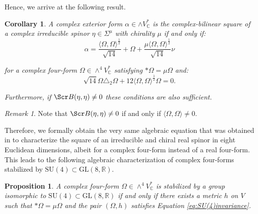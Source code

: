 \documentclass[10pt,a4paper,twoside,reqno]{amsart}
\theoremstyle{plain}
\newtheorem{prop}[thm]{Proposition}
\newtheorem{cor}[thm]{Corollary}
\theoremstyle{definition}
\theoremstyle{remark}
\newtheorem{remark}[thm]{Remark}
\def\C{\mathbb{C}}
\def\scB{\Scr B}
\def\SU{\mathrm{SU}}
\newcommand{\escal}[1]{\langle#1\rangle}
\begin{document}
\noindent
Hence, we arrive at the following result.

\begin{cor}
\label{cor:Bilinear8d}
A complex exterior form $\alpha\in\wedge V^*_\C$ is the complex-bilinear square of a complex irreducible spinor $\eta\in\Sigma^\mu$ with chirality $\mu$ if and only if:
\begin{equation}
\label{eq:alphaSU(4)}
\alpha =  \frac{\langle \Omega , \Omega \rangle^{\frac{1}{2}}}{\sqrt{14}}  + \Omega + \frac{\mu\langle \Omega , \Omega \rangle^{\frac{1}{2}}}{\sqrt{14}}   \nu
\end{equation}

\noindent
for a complex four-form $\Omega \in \wedge^4 V^{\ast}_{\C}$ satisfying $*\Omega=\mu\Omega$ and:
\begin{equation}
\label{eq:SU(4)invariance}
\sqrt{14}\Omega\triangle_2\Omega + 12 \langle \Omega , \Omega \rangle^{\frac{1}{2}} \Omega = 0.
\end{equation}

\noindent
Furthermore, if $\scB(\eta,\eta)\neq0$ these conditions are also sufficient.
\end{cor}

\begin{remark}
Note that $\scB(\eta,\eta)\neq0$ if and only if $\escal{\Omega,\Omega}\neq0$.
\end{remark}

\noindent
Therefore, we formally obtain the very same algebraic equation that was obtained in \cite[Theorem 4.5]{LS24_Spin7} to characterize the square of an irreducible and chiral real spinor in eight Euclidean dimensions, albeit for a complex four-form instead of a real four-form. This leads to the following algebraic characterization of complex four-forms stabilized by $\SU(4)\subset \mathrm{GL}(8,\mathbb{R})$.

\begin{prop}
A complex four-form $\Omega\in \wedge^4 V^{\ast}_{\C}$ is stabilized by a group isomorphic to $\SU(4)\subset \mathrm{GL}(8,\mathbb{R})$ if and only if there exists a metric $h$ on $V$ such that $*\Omega=\mu\Omega$ and the pair $(\Omega,h)$ satisfies Equation \eqref{eq:SU(4)invariance}.
\end{prop}
\end{document}

